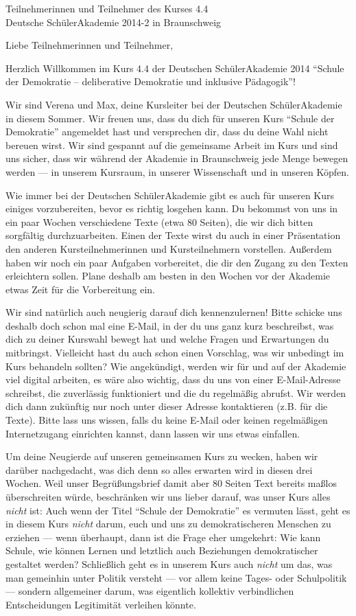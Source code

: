 \documentclass[a4paper]{letter}
\date{15.\ April 2014}
\begin{document}
\begin{letter}{
	Teilnehmerinnen und Teilnehmer des Kurses 4.4 \\
	Deutsche SchülerAkademie 2014-2 in Braunschweig}

\opening{Liebe Teilnehmerinnen und Teilnehmer,}

Herzlich Willkommen im Kurs 4.4 der Deutschen SchülerAkademie 2014 ``Schule der Demokratie -- deliberative Demokratie und inklusive Pädagogik''!

Wir sind Verena und Max, deine Kursleiter bei der Deutschen SchülerAkademie in diesem Sommer.
Wir freuen uns, dass du dich für unseren Kurs ``Schule der Demokratie'' angemeldet hast und versprechen dir, dass du deine Wahl nicht bereuen wirst.
Wir sind gespannt auf die gemeinsame Arbeit im Kurs und sind uns sicher, dass wir während der Akademie in Braunschweig jede Menge bewegen werden --– in unserem Kursraum, in unserer Wissenschaft und in unseren Köpfen.

Wie immer bei der Deutschen SchülerAkademie gibt es auch für unseren Kurs einiges vorzubereiten, bevor es richtig losgehen kann.
Du bekommst von uns in ein paar Wochen verschiedene Texte (etwa 80 Seiten), die wir dich bitten sorgfältig durchzuarbeiten.
Einen der Texte wirst du auch in einer Präsentation den anderen Kursteilnehmerinnen und Kursteilnehmern vorstellen.
Außerdem haben wir noch ein paar Aufgaben vorbereitet, die dir den Zugang zu den Texten erleichtern sollen.
Plane deshalb am besten in den Wochen vor der Akademie etwas Zeit für die Vorbereitung ein.

Wir sind natürlich auch neugierig darauf dich kennenzulernen!
Bitte schicke uns deshalb doch schon mal eine E-Mail, in der du uns ganz kurz beschreibst, was dich zu deiner Kurswahl bewegt hat und welche Fragen und Erwartungen du mitbringst.
Vielleicht hast du auch schon einen Vorschlag, was wir unbedingt im Kurs behandeln sollten?
Wie angekündigt, werden wir für und auf der Akademie viel digital arbeiten, es wäre also wichtig, dass du uns von einer E-Mail-Adresse schreibst, die zuverlässig funktioniert und die du regelmäßig abrufst.
Wir werden dich dann zukünftig nur noch unter dieser Adresse kontaktieren (z.B. für die Texte).
Bitte lass uns wissen, falls du keine E-Mail oder keinen regelmäßigen Internetzugang einrichten kannst, dann lassen wir uns etwas einfallen.

Um deine Neugierde auf unseren gemeinsamen Kurs zu wecken, haben wir darüber nachgedacht, was dich denn so alles erwarten wird in diesen drei Wochen.
Weil unser Begrüßungsbrief damit aber 80 Seiten Text bereits maßlos überschreiten würde, beschränken wir uns lieber darauf, was unser Kurs alles \emph{nicht} ist:
Auch wenn der Titel ``Schule der Demokratie'' es vermuten lässt, geht es in diesem Kurs \emph{nicht} darum, euch und uns zu demokratischeren Menschen zu erziehen --- wenn überhaupt, dann ist die Frage eher umgekehrt: Wie kann Schule, wie können Lernen und letztlich auch Beziehungen demokratischer gestaltet werden?
Schließlich geht es in unserem Kurs auch \emph{nicht} um das, was man gemeinhin unter Politik versteht --- vor allem keine Tages- oder Schulpolitik --- sondern allgemeiner darum, was eigentlich kollektiv verbindlichen Entscheidungen Legitimität verleihen könnte.


\end{letter}
\end{document}
